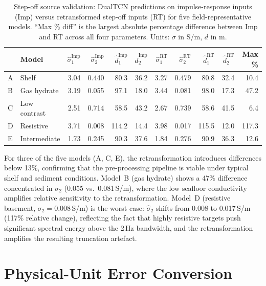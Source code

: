 \documentclass[journal]{IEEEtran}
\begin{document}
\begin{table}[t]
  \centering
  \footnotesize
  \caption{Step-off source validation: DualTCN predictions on
  impulse-response inputs (Imp) versus retransformed step-off inputs
  (RT) for five field-representative models.  ``Max \% diff'' is the
  largest absolute percentage difference between Imp and RT across all
  four parameters.  Units: $\sigma$ in S/m, $d$ in m.}
  \label{tab:supp_stepoff}
  \setlength{\tabcolsep}{3.5pt}
  \begin{tabular}{llrrrr@{\;\;}rrrr@{\;\;}r}
    \toprule
    & Model
      & $\hat\sigma_1^\mathrm{Imp}$ & $\hat\sigma_2^\mathrm{Imp}$
      & $\hat{d}_1^\mathrm{Imp}$ & $\hat{d}_2^\mathrm{Imp}$
      & $\hat\sigma_1^\mathrm{RT}$ & $\hat\sigma_2^\mathrm{RT}$
      & $\hat{d}_1^\mathrm{RT}$ & $\hat{d}_2^\mathrm{RT}$
      & Max \% \\
    \midrule
    A & Shelf
      & 3.04 & 0.440 & 80.3 & 36.2
      & 3.27 & 0.479 & 80.8 & 32.4 & 10.4 \\
    B & Gas hydrate
      & 3.19 & 0.055 & 97.1 & 18.0
      & 3.44 & 0.081 & 98.0 & 17.3 & 47.2 \\
    C & Low contrast
      & 2.51 & 0.714 & 58.5 & 43.2
      & 2.67 & 0.739 & 58.6 & 41.5 & 6.4 \\
    D & Resistive
      & 3.71 & 0.008 & 114.2 & 14.4
      & 3.98 & 0.017 & 115.5 & 12.0 & 117.3 \\
    E & Intermediate
      & 1.73 & 0.245 & 90.3 & 37.6
      & 1.84 & 0.276 & 90.9 & 36.3 & 12.6 \\
    \bottomrule
  \end{tabular}
\end{table}

For three of the five models (A, C, E), the retransformation
introduces differences below 13\%, confirming that the pre-processing
pipeline is viable under typical shelf and sediment conditions.
Model~B (gas hydrate) shows a 47\% difference concentrated in
$\sigma_2$ (0.055 vs.\ 0.081\,S/m), where the low seafloor
conductivity amplifies relative sensitivity to the retransformation.
Model~D (resistive basement, $\sigma_2 = 0.008$\,S/m) is the worst
case: $\hat{\sigma}_2$ shifts from 0.008 to 0.017\,S/m (117\%
relative change), reflecting the fact that highly resistive targets
push significant spectral energy above the 2\,Hz bandwidth, and the
retransformation amplifies the resulting truncation artefact.


\section{Physical-Unit Error Conversion}
\label{sec:supp_phys}
\end{document}

